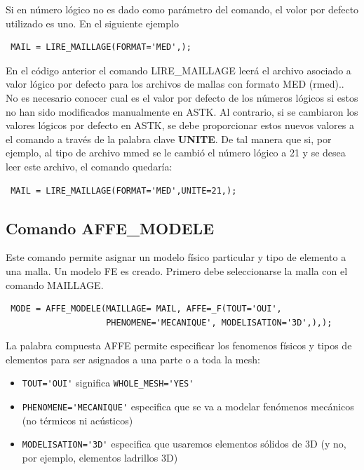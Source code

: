 \documentclass[12pt]{book}
\theoremstyle{definition}
\theoremstyle{remark}
\theoremstyle{plain}
\begin{document}
Si en número lógico no es dado como parámetro del comando, el volor por defecto 
utilizado es uno. En el siguiente ejemplo

\begin{verbatim}
 MAIL = LIRE_MAILLAGE(FORMAT='MED',);
\end{verbatim}

En el código anterior el comando LIRE\_MAILLAGE leerá el archivo asociado a valor 
lógico por defecto para los archivos de mallas con formato MED (rmed).. No es necesario
conocer cual es el valor por defecto de los números lógicos si estos no han
sido modificados manualmente en ASTK. Al contrario, si se cambiaron los
valores lógicos por defecto en ASTK, se debe proporcionar estos nuevos valores a el
comando a través de la palabra clave \textbf{UNITE}. De tal manera que si, por ejemplo,
al tipo de archivo mmed se le cambió el número lógico a 21 y se desea leer este
archivo, el comando quedaría:

\begin{verbatim}
 MAIL = LIRE_MAILLAGE(FORMAT='MED',UNITE=21,);
\end{verbatim}

\subsection{Comando AFFE\_MODELE}

Este comando permite asignar un modelo físico particular y tipo de elemento 
a una malla. Un modelo FE es creado. Primero debe seleccionarse la malla con el
 comando MAILLAGE. 


\begin{verbatim}
 MODE = AFFE_MODELE(MAILLAGE= MAIL, AFFE=_F(TOUT='OUI',
                    PHENOMENE='MECANIQUE', MODELISATION='3D',),);
\end{verbatim}

La palabra compuesta AFFE permite especificar los fenomenos
físicos y tipos de elementos para ser asignados a una parte o a toda la mesh:

\begin{itemize}
 \item \verb*|TOUT='OUI'| significa \verb*|WHOLE_MESH='YES'|
 \item \verb*|PHENOMENE='MECANIQUE'| especifica que se va a modelar fenómenos
        mecánicos (no térmicos ni acústicos)
 \item \verb*|MODELISATION='3D'| especifica que usaremos elementos sólidos de 3D
       (y no, por ejemplo, elementos ladrillos 3D)
\end{itemize}
\end{document}
